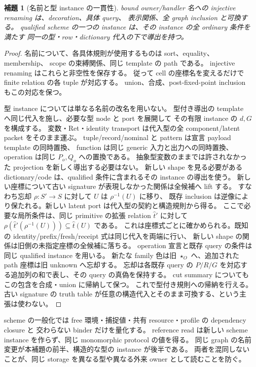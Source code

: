 \documentclass[11pt,a4paper]{article}
\newtheorem{lemma}[definition]{補題}
\begin{document}
\begin{lemma}[名前と型 instance の一貫性]
bound owner/handler 名への injective renaming は、decoration、具体 query、
表示関係、全 graph inclusion と可換する。
qualified scheme の一つの instance は、その instance の全 ordinary 条件を満たす
同一の型・row・dictionary 代入の下で導出を持つ。
\end{lemma}
\begin{proof}
名前について、各具体規則が使用するものは sort、equality、membership、
scope の束縛関係、同じ template の path である。
injective renaming はこれらと非空性を保存する。
従って cell の座標名を変えるだけで finite relation の各 tuple が対応する。
union、合成、post-fixed-point inclusion もこの対応を保つ。

型 instance については単なる名前の改名を用いない。
型付き導出の template へ同じ代入を施し、必要な型 node と port を展開して
その有限 instance の \(d,G\) を構成する。
変数・Ret・identity transport は代入型の全 component/latent packet をそのまま運ぶ。
tuple/record/nominal と pattern は宣言 payload template の同時置換、
function は同じ generic 入力と出力への同時置換、operation は同じ \(P_o,Q_o\) への置換である。
抽象型変数のままでは許されなかった projection を新しく導出する必要はない。
新しい shape を見る必要がある dictionary/code は、qualified 条件に含まれるその instance の導出を使う。
新しい座標について古い signature が表現しなかった関係は全候補へ lift する。
すなわち忘却 \(\rho:S'\to S\) に対して \(U\) は \(\rho^{-1}(U)\) に移り、
既存 inclusion は逆像により保たれる。新しい latent port は代入型の契約と構造規則から得る。
ここで必要な局所条件は、同じ primitive の拡張 relation \(\widehat t'\) に対して
\(\rho(\widehat t'(\rho^{-1}(U)))\subseteq\widehat t(U)\) である。
これは座標式ごとに確かめられる。既知の identity/prefix/fresh/receipt 式は同じ代入を両端に行い、
新しい shape の関係は旧側の未指定座標の全候補に落ちる。
operation 宣言と既存 query の条件は同じ qualified instance を用いる。
新たな family 色は旧 \(\star_O\) へ、追加された path 座標は旧 unknown へ忘却する。
忘却は各既存 query の \(P/R/G\) を対応する追加列の和で表し、その query の真偽を保持する。
cut summary についてもこの包含を合成・union に帰納して保つ。
これで型付き規則への帰納を行える。
古い signature の truth table が任意の構造代入とそのまま可換する、という主張は使わない。
\end{proof}

scheme の一般化では free 環境・捕捉値・共有 resource・profile の dependency closure と
交わらない binder だけを量化する。
reference read は新しい scheme instance を作らず、同じ monomorphic protocol の値を得る。
同じ graph の名前変更が本補題の前半、構造的な型の instance が後半である。
両者を混同しないことが、同じ storage を異なる型や異なる外来 owner として読むことを防ぐ。
\end{document}
